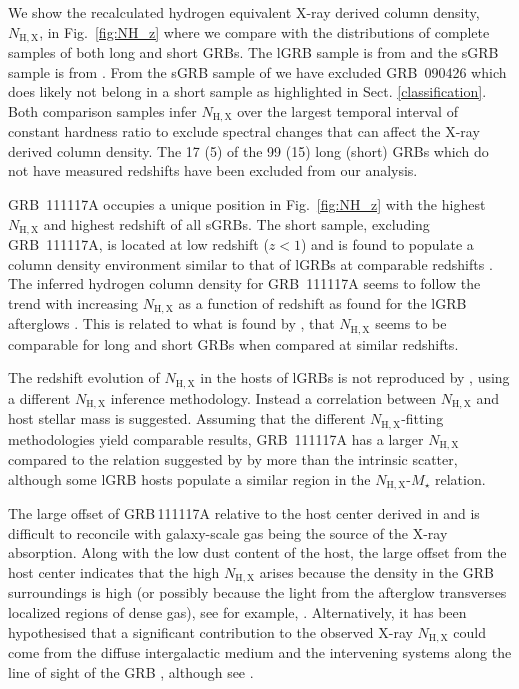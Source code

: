 \documentclass[referee]{aa}
\begin{document}
We show the recalculated hydrogen equivalent X-ray derived column density,
$N_\mathrm{H,X}$, in Fig.~\ref{fig:NH_z} where we compare with the distributions
of complete samples of both long and short GRBs. The lGRB sample is from
\citet{Arcodia2016} and the sGRB sample is from \citet{DAvanzo2014a}. From the
sGRB sample of \citet{DAvanzo2014a} we have excluded GRB~090426 which does
likely not belong in a short sample as highlighted in Sect.
\ref{classification}. Both comparison samples infer $N_\mathrm{H,X}$  over the
largest temporal interval of constant hardness ratio to exclude spectral changes
that can affect the X-ray derived column density. The 17 (5) of the 99 (15) long
(short) GRBs which do not have measured redshifts have been excluded from our
analysis.

GRB~111117A occupies a unique position in Fig.~\ref{fig:NH_z} with the highest
$N_\mathrm{H,X}$ and highest redshift of all sGRBs. The short sample, excluding
GRB~111117A, is located at low redshift ($z < 1$) and is found to populate a
column density environment similar to that of lGRBs at comparable redshifts
\citep{DAvanzo2014a}. The inferred hydrogen column density for GRB~111117A seems
to follow the trend with increasing $N_\mathrm{H,X}$ as a function of redshift as found for
the lGRB afterglows \citep{Campana2010, Starling2013, Arcodia2016}. This is
related to what is found by \citet{Kopac2012, Margutti2013}, that $N_\mathrm{H,X}$ seems to
be comparable for long and short GRBs when compared at similar redshifts.

The redshift evolution of $N_\mathrm{H,X}$ in the hosts of lGRBs is not
reproduced by \citet{Buchner2017}, using a different $N_\mathrm{H,X}$ inference
methodology. Instead a correlation between $N_\mathrm{H,X}$ and host stellar
mass is suggested. Assuming that the different $N_\mathrm{H,X}$-fitting
methodologies yield comparable results, GRB~111117A has a larger
$N_\mathrm{H,X}$ compared to the relation suggested by \citet{Buchner2017} by
more than the intrinsic scatter, although some lGRB hosts populate a similar
region in the $N_\mathrm{H,X}$-$M_\star$ relation.

The large offset of GRB\,111117A relative to the host center derived in
\citet{Margutti2012} and \citet{Sakamoto2013} is difficult to reconcile with
galaxy-scale gas being the source of the X-ray absorption. Along with the low
dust content of the host, the large offset from the host center indicates that
the high $N_\mathrm{H,X}$ arises because the density in the GRB surroundings is
high (or possibly because the light from the afterglow transverses localized
regions of dense gas), see for example,
\citep[e.g.][]{Watson2013, Krongold2013}. Alternatively, it has been
hypothesised that a significant contribution to the observed X-ray
$N_\mathrm{H,X}$ could come from the diffuse intergalactic medium and the
intervening systems along the line of sight of the GRB \citep{Campana2012,
	Arcodia2016}, although see \citep{Watson2013, Krongold2013}.
\end{document}
